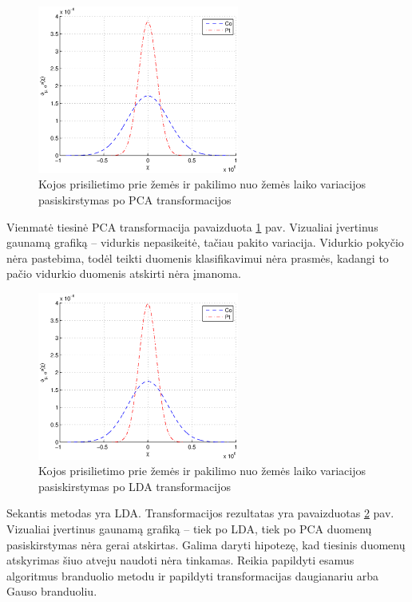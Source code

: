 \documentclass[]{vgtuef}
\begin{document}
\begin{figure}[!t]
  \centering
  \includegraphics[width=250px]{figures/st_sw_linear_kpca.eps}
  \caption{Kojos prisilietimo prie žemės ir pakilimo nuo žemės laiko variacijos pasiskirstymas po PCA transformacijos}
  \label{fig:linear_pca}
\end{figure}

Vienmatė tiesinė PCA transformacija pavaizduota \ref{fig:linear_pca} pav. Vizualiai įvertinus gaunamą grafiką -- vidurkis nepasikeitė, tačiau pakito variacija. Vidurkio pokyčio nėra pastebima, todėl teikti duomenis klasifikavimui nėra prasmės, kadangi to pačio vidurkio duomenis atskirti nėra įmanoma.

\begin{figure}[!t]
  \centering
  \includegraphics[width=250px]{figures/st_sw_linear_lda.eps}
  \caption{Kojos prisilietimo prie žemės ir pakilimo nuo žemės laiko variacijos pasiskirstymas po LDA transformacijos}
  \label{fig:linear_lda}
\end{figure}

Sekantis metodas yra LDA. Transformacijos rezultatas yra pavaizduotas \ref{fig:linear_lda} pav. Vizualiai įvertinus gaunamą grafiką -- tiek po LDA, tiek po PCA duomenų pasiskirstymas nėra gerai atskirtas. Galima daryti hipotezę, kad tiesinis duomenų atskyrimas šiuo atveju naudoti nėra tinkamas. Reikia papildyti esamus algoritmus branduolio metodu ir papildyti transformacijas daugianariu arba Gauso branduoliu.
\end{document}
